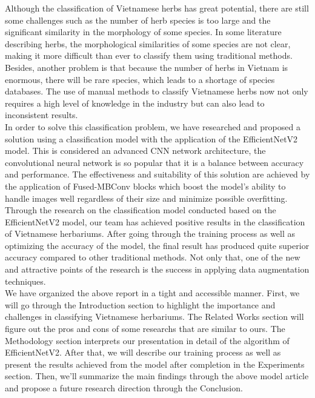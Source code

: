 \documentclass[conference]{IEEEtran}
\begin{document}
Although the classification of Vietnamese herbs has great potential, there are still some challenges such as the number of herb species is too large and the significant similarity in the morphology of some species. In some literature describing herbs, the morphological similarities of some species are not clear, making it more difficult than ever to classify them using traditional methods. Besides, another problem is that because the number of herbs in Vietnam is enormous, there will be rare species, which leads to a shortage of species databases. The use of manual methods to classify Vietnamese herbs now not only requires a high level of knowledge in the industry but can also lead to inconsistent results.\\

In order to solve this classification problem, we have researched and proposed a solution using a classification model with the application of the EfficientNetV2 model. This is considered an advanced CNN network architecture, the convolutional neural network is so popular that it is a balance between accuracy and performance. The effectiveness and suitability of this solution are achieved by the application of Fused-MBConv blocks which boost the model's ability to handle images well regardless of their size and minimize possible overfitting.  \\

Through the research on the classification model conducted based on the EfficientNetV2 model, our team has achieved positive results in the classification of Vietnamese herbariums. After going through the training process as well as optimizing the accuracy of the model, the final result has produced quite superior accuracy compared to other traditional methods. Not only that, one of the new and attractive points of the research is the success in applying data augmentation techniques.\\

We have organized the above report in a tight and accessible manner. First, we will go through the Introduction section to highlight the importance and challenges in classifying Vietnamese herbariums. The Related Works section will figure out the pros and cons of some researchs that are similar to ours. The Methodology section interprets our presentation in detail of the algorithm of EfficientNetV2. After that, we will describe our training process as well as present the results achieved from the model after completion in the Experiments section. Then, we'll summarize the main findings through the above model article and propose a future research direction through the Conclusion.
\end{document}
